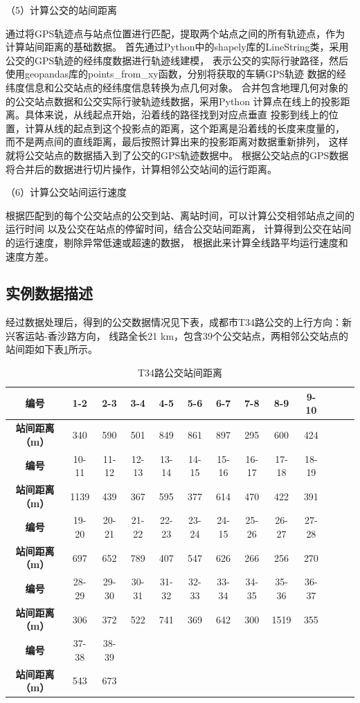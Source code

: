 （5）计算公交的站间距离

通过将GPS轨迹点与站点位置进行匹配，提取两个站点之间的所有轨迹点，作为计算站间距离的基础数据。
首先通过Python中的shapely库的LineString类，采用公交的GPS轨迹的经纬度数据进行轨迹线建模，
表示公交的实际行驶路径，然后使用geopandas库的points\_from\_xy函数，分别将获取的车辆GPS轨迹
数据的经纬度信息和公交站点的经纬度信息转换为点几何对象。
合并包含地理几何对象的的公交站点数据和公交实际行驶轨迹线数据，采用Python
计算点在线上的投影距离。具体来说，从线起点开始，沿着线的路径找到对应点垂直
投影到线上的位置，计算从线的起点到这个投影点的距离，这个距离是沿着线的长度来度量的，
而不是两点间的直线距离，最后按照计算出来的投影距离对数据重新排列，
这样就将公交站点的数据插入到了公交的GPS轨迹数据中。
根据公交站点的GPS数据将合并后的数据进行切片操作，计算相邻公交站间的运行距离。

（6）计算公交站间运行速度

根据匹配到的每个公交站点的公交到站、离站时间，可以计算公交相邻站点之间的运行时间
以及公交在站点的停留时间，结合公交站间距离，
计算得到公交在站间的运行速度，剔除异常低速或超速的数据，
根据此来计算全线路平均运行速度和速度方差。
\subsection{实例数据描述}
经过数据处理后，得到的公交数据情况见下表，成都市T34路公交的上行方向：新兴客运站-香沙路方向，
线路全长21 km，包含39个公交站点，两相邻公交站点的站间距如下表\ref{tab4-1}所示。
\begin{table}[!ht]
\centering
\caption{T34路公交站间距离}
\label{tab4-1}
\begin{tabular}{ccccccccccccc}
\toprule
\textbf{编号} & 1-2 & 2-3 & 3-4  & 4-5 & 5-6  & 6-7 & 7-8 & 8-9 & 9-10 \\
\midrule
\textbf{站间距离（m）} & 340 & 590 & 501 & 849 & 861 & 897  & 295 & 600 & 424\\
\toprule
\textbf{编号} & 10-11 & 11-12  & 12-13  & 13-14  & 14-15 & 15-16  & 16-17 & 17-18 & 18-19 & \\
\midrule
\textbf{站间距离（m）}  & 1139 & 439 & 367  & 595 & 377 & 614 & 470 & 422 & 391 \\
\toprule
\textbf{编号} & 19-20 & 20-21 & 21-22 & 22-23  & 23-24 & 24-15& 25-26 & 26-27 & 27-28 \\  
\midrule
\textbf{站间距离（m）} & 697 & 652 & 789 & 407 & 547 & 626 & 266 & 256 & 270  \\
\toprule
\textbf{编号} & 28-29 & 29-30 & 30-31 & 31-32 & 32-33  & 33-34 & 34-35 & 35-36 & 36-37  \\  
\midrule
\textbf{站间距离（m）}& 306 & 372 & 522 & 741 & 369 & 642 & 300 & 1519 & 355 \\
\toprule
\textbf{编号}  & 37-38  & 38-39\\  
\midrule
\textbf{站间距离（m）}& 543 & 673 \\
\bottomrule
\end{tabular}
\end{table}

